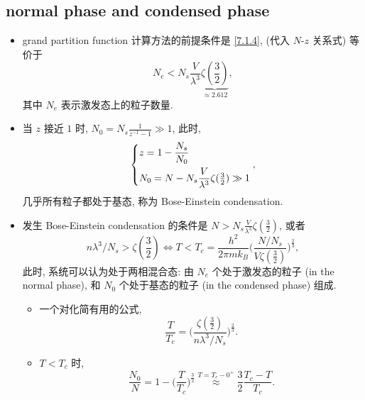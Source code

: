 \subsection{normal phase and condensed phase}
\begin{itemize}
	\item grand partition function 计算方法的前提条件是 \eqref{7.1.4}, (代入 $N$-$z$ 关系式) 等价于
	\begin{equation}
		N_e < N_s \frac{V}{\lambda^3} \underbrace{\zeta({\textstyle \frac{3}{2}})}_{\approx 2.612},
	\end{equation} 
	其中 $N_e$ 表示激发态上的粒子数量.
	
	\item 当 $z$ 接近 $1$ 时, $N_0 = N_s \frac{1}{z^{- 1} - 1} \gg 1$, 此时,
	\begin{equation}
		\begin{dcases}
			z = 1 - \frac{N_s}{N_0} \\
			N_0 = N - N_s \frac{V}{\lambda^3} \zeta({\textstyle \frac{3}{2}}) \gg 1
		\end{dcases},
	\end{equation}
	几乎所有粒子都处于基态, 称为 Bose-Einstein condensation.
	
	\item 发生 Bose-Einstein condensation 的条件是 $N > N_s \frac{V}{\lambda^3} \zeta(\frac{3}{2})$, 或者
	\begin{equation}
		n \lambda^3 / N_s > \zeta({\textstyle \frac{3}{2}}) \iff T < T_c = \frac{h^2}{2 \pi m k_B} \Big( \frac{N / N_s}{V \zeta(\frac{3}{2})} \Big)^{\frac{2}{3}},
	\end{equation}
	此时, 系统可以认为处于两相混合态: 由 $N_e$ 个处于激发态的粒子 (in the normal phase), 和 $N_0$ 个处于基态的粒子 (in the condensed phase) 组成.
	\begin{itemize}
		\item 一个对化简有用的公式,
		\begin{equation}
			\frac{T}{T_c} = \Big( \frac{\zeta({\textstyle \frac{3}{2}})}{n \lambda^3 / N_s} \Big)^{\frac{2}{3}}.
		\end{equation}
		
		\item $T < T_c$ 时,
		\begin{equation}
			\frac{N_0}{N} = 1 - \Big( \frac{T}{T_c} \Big)^{\frac{3}{2}} \overset{T = T_c - 0^+}{\approx} \frac{3}{2} \frac{T_c - T}{T_c}.
		\end{equation}
	\end{itemize}
	

\end{itemize}
